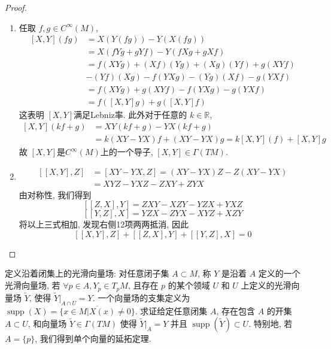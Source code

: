 \documentclass[../main.tex]{subfiles}
\begin{document}
\begin{proof}
    \begin{enumerate}
        \item 任取 \(  f,g \in C^{\infty}\left( M \right)   \),  \[
    \begin{aligned}
    [X,Y]\left( fg \right)&= X\left( Y\left( fg \right)  \right)-Y\left( X\left( fg \right)  \right)\\ 
     &=  X\left( f Yg+ gYf \right)- Y\left( fXg+ gXf \right)\\ 
      &= f \left( XYg \right) + \left( Xf \right)\left( Yg \right)+  \left( Xg \right)\left( Yf \right)+ g\left( XYf \right)\\ 
       &- \left( Yf \right)\left( Xg \right)- f\left( YXg \right)- \left( Yg \right)\left( Xf \right)- g\left( YXf \right)\\ 
        &= f\left( XYg \right)+ g\left( XYf \right)- f\left( YXg \right)-            g\left( YXf \right)\\ 
         &= f\left(  \left[ X,Y \right]g   \right)+ g\left( \left[ X,Y \right]f  \right)  
    \end{aligned}
    \]这表明 \(  \left[ X,Y \right]   \)满足Lebniz率. 此外对于任意的 \(  k \in \mathbb{R}   \),   \[
   \begin{aligned}
    [X,Y]\left( kf + g\right)&= XY\left( kf + g\right)-YX\left( kf + g\right)\\ 
     &= k\left( XY-YX \right)f +\left( XY-YX \right)g  = k\left[ X,Y \right]\left( f \right)   + \left[ X,Y \right]g  
   \end{aligned}  
    \]故 \(  \left[ X,Y \right]   \)是\(  C^{\infty}\left( M \right)   \)上的一个导子,  \(  \left[ X,Y \right] \in  \Gamma \left( TM \right)    \).   
    \item  \[
    \begin{aligned}
    \left[ \left[ X,Y \right],Z  \right]&= \left[ XY-YX,Z \right]= \left( XY-YX \right)Z-Z\left( XY-YX \right)\\ 
     &=  XYZ-YXZ-ZXY+ ZYX     
    \end{aligned}
    \]由对称性, 我们得到 \[
    \left[ \left[ Z,X \right],Y  \right]= ZXY- XZY- YZX+ YXZ
    \] \[
    \left[ \left[ Y,Z \right],X  \right]=YZX- ZYX-XYZ+ XZY
    \]将以上三式相加, 发现右侧12项两两抵消, 因此 \[
    \left[ \left[ X,Y \right],Z  \right]+ \left[ \left[ Z,X \right],Y  \right]+ \left[ \left[ Y,Z \right],X  \right]   = 0
    \]
    \end{enumerate}
    
\end{proof}
\begin{exercise}{}{}
定义沿着闭集上的光滑向量场: 对任意闭子集 $A \subset M$, 称 $Y$ 是沿着 $A$ 定义的一个光滑向量场, 若 $\forall p \in A, Y_p \in T_p M$, 且存在 $p$ 的某个领域 $U$ 和 $U$ 上定义的光滑向量场 $\tilde{Y}$, 使得 $\tilde{Y}|_{A \cap U} = Y$. 一个向量场的支集定义为 $\operatorname{supp}(X) = \overline{\{x \in M | X(x) \neq 0\}}$. 求证给定任意闭集 $A$, 存在包含 $A$ 的开集 $A \subset U$, 和向量场 $\tilde{Y} \in \Gamma(TM)$ 使得 $\tilde{Y}|_A = Y$ 并且 $\operatorname{supp}(\tilde{Y}) \subset U$. 特别地, 若 $A = \{p\}$, 我们得到单个向量的延拓定理.
\end{exercise}
\end{document}
